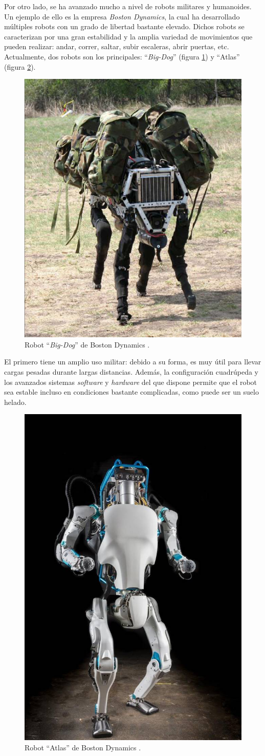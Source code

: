 Por otro lado, se ha avanzado mucho a nivel de robots militares y humanoides. Un ejemplo
de ello es la empresa \textit{Boston Dynamics}, la cual ha desarrollado múltiples robots
con un grado de libertad bastante elevado. Dichos robots se caracterizan por una gran 
estabilidad y la amplia variedad de movimientos que pueden realizar: andar, correr,
saltar, subir escaleras, abrir puertas, etc. Actualmente, dos robots son los principales:
``\textit{Big-Dog}'' (figura \ref{fig:big-dog}) y ``Atlas'' (figura \ref{fig:atlas}).

\begin{figure}[H]
    \centering
    \includegraphics[width=.3\linewidth]{pictures/big-dog.png}
    \caption{Robot ``\textit{Big-Dog}'' de Boston Dynamics \cite{BostonDynamics2020a}.}
    \label{fig:big-dog}
\end{figure}

El primero tiene un amplio uso militar: debido a su forma, es muy útil para llevar cargas
pesadas durante largas distancias. Además, la configuración cuadrúpeda y los avanzados 
sistemas \textit{software} y \textit{hardware} del que dispone permite que el robot sea
estable incluso en condiciones bastante complicadas, como puede ser un suelo helado.

\begin{figure}[H]
    \centering
    \includegraphics[width=.3\linewidth]{pictures/atlas.jpg}
    \caption{Robot ``Atlas'' de Boston Dynamics \cite{BostonDynamics2020a}.}
    \label{fig:atlas}
\end{figure}

